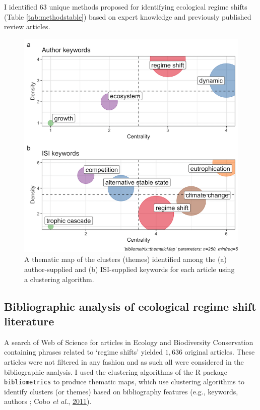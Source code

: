 \documentclass[print]{nuthesis}
\begin{document}
I identified 63 unique methods proposed for identifying ecological regime shifts (Table \ref{tab:methodstable}) based on expert knowledge and previously published review articles.
\begin{figure}
\includegraphics[width=0.85\linewidth]{./chapterFiles/rdmReview/figures/figsCalledInDiss/thematicMaps-keywords} \caption{A thematic map of the clusters (themes) identified among the (a) author-supplied and (b) ISI-supplied keywords for each article using a clustering algorithm.}\label{fig:thematicMaps-keyword}
\end{figure}
\hypertarget{bibliographic-analysis-of-ecological-regime-shift-literature}{%
\subsection{Bibliographic analysis of ecological regime shift literature}\label{bibliographic-analysis-of-ecological-regime-shift-literature}}

A search of Web of Science for articles in Ecology and Biodiversity Conservation containing phrases related to `regime shifts' yielded \(1,636\) original articles. These articles were not filtered in any fashion and as such all were considered in the bibliographic analysis. I used the clustering algorithms of the R package \texttt{bibliometrics} to produce thematic maps, which use clustering algorithms to identify clusters (or themes) based on bibliography features (e.g., keywords, authors ; Cobo \emph{et al.}, \protect\hyperlink{ref-cobo2011approach}{2011}).
\end{document}
